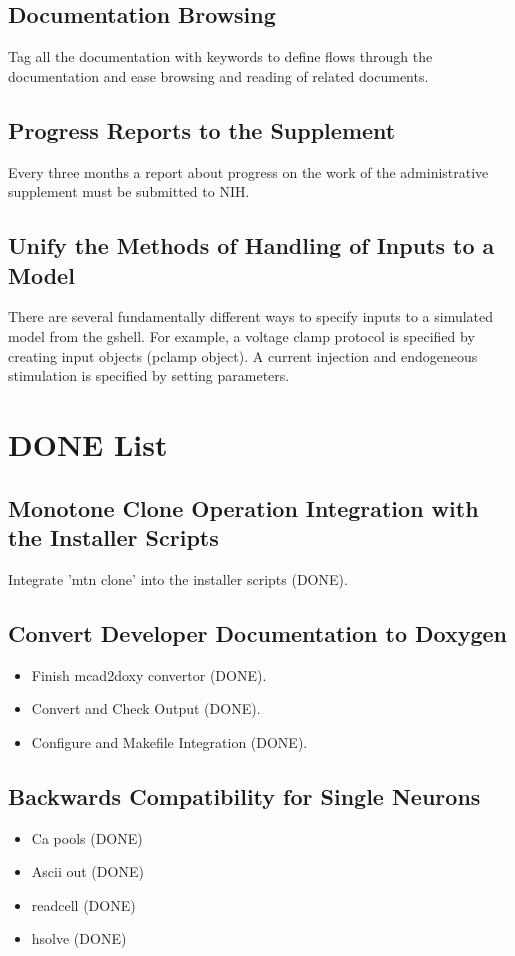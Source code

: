 \documentclass[12pt]{article}
\begin{document}
\subsection{Documentation Browsing}

Tag all the documentation with keywords to define flows through the
documentation and ease browsing and reading of related documents.


\subsection{Progress Reports to the Supplement}

Every three months a report about progress on the work of the
administrative supplement must be submitted to NIH.


\subsection{Unify the Methods of Handling of Inputs to a Model}

There are several fundamentally different ways to specify inputs to a
simulated model from the gshell.  For example, a voltage clamp
protocol is specified by creating input objects (pclamp object).  A
current injection and endogeneous stimulation is specified by setting
parameters.


\section{DONE List}

\subsection{Monotone Clone Operation Integration with the Installer Scripts}
Integrate 'mtn clone' into the installer scripts (DONE).

\subsection{Convert Developer Documentation to Doxygen}

\begin{itemize}
\item Finish mcad2doxy convertor (DONE).
\item Convert and Check Output (DONE).
\item Configure and Makefile Integration (DONE).
\end{itemize}

\subsection{Backwards Compatibility for Single Neurons}

\begin{itemize}
\item Ca pools (DONE)
\item Ascii out (DONE)
\item readcell (DONE)
\item hsolve (DONE)
\end{itemize}
\end{document}
